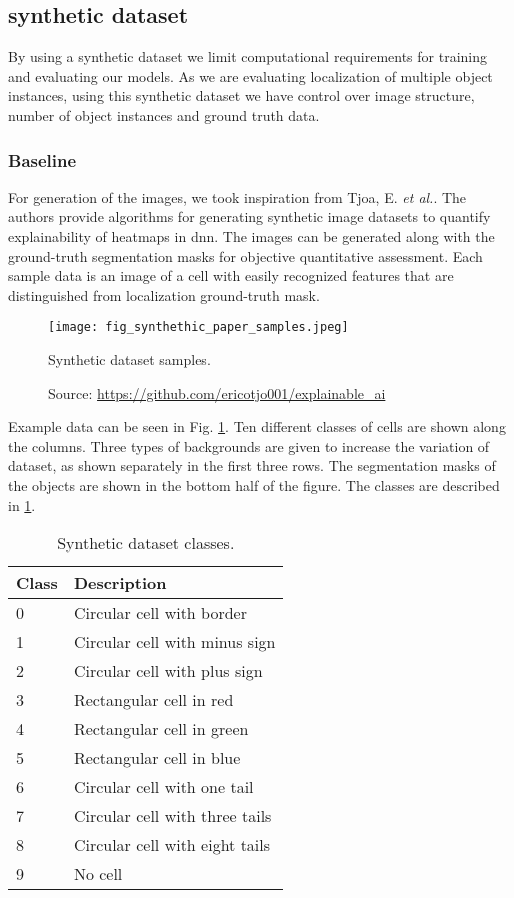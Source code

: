 \subsection{synthetic dataset}
By using a synthetic dataset we limit computational requirements for training and evaluating our models. As we are evaluating localization of multiple object instances, using this synthetic dataset we have control over image structure, number of object instances and ground truth data. 

\subsubsection{Baseline}
For generation of the images, we took inspiration from Tjoa, E. \textit{et al.}. The authors provide algorithms for generating synthetic image datasets to quantify explainability of heatmaps in \acrshort{dnn}. The images can be generated along with the ground-truth segmentation masks for objective quantitative assessment. Each sample data is an image of a cell with easily recognized features that are  distinguished from localization ground-truth mask.
\begin{figure}[ht]
    \begin{center}       
    \texttt{[image: fig\_synthethic\_paper\_samples.jpeg]}
    \caption[Synthetic dataset samples]{Synthetic dataset samples.}
    \caption*{Source: \href{https://github.com/ericotjo001/explainable\_ai}{https://github.com/ericotjo001/explainable\_ai}}
    \label{fig:synthetic_paper_samples}
    \end{center}
\end{figure}

Example data can be seen in Fig. \ref{fig:synthetic_paper_samples}. Ten different classes of cells are shown along the columns. Three types of backgrounds are given to increase the variation of dataset, as shown separately in the first three rows. The segmentation masks of the objects are shown in the bottom half of the figure. The classes are described in \ref{tab:synthetic_classes}.
\begin{table}[ht]
\centering
\begin{tabular}{|l|l|}
  \hline
  Class & Description \\
  \hline
  0 & Circular cell with border\\
  1 & Circular cell with minus sign\\
  2 & Circular cell with plus sign\\
  3 & Rectangular cell in red\\
  4 & Rectangular cell in green\\
  5 & Rectangular cell in blue\\
  6 & Circular cell with one tail\\
  7 & Circular cell with three tails\\
  8 & Circular cell with eight tails\\
  9 & No cell\\
  \hline
\end{tabular}
\caption[Synthetic dataset classes]{Synthetic dataset classes.}
\label{tab:synthetic_classes}
\end{table}

